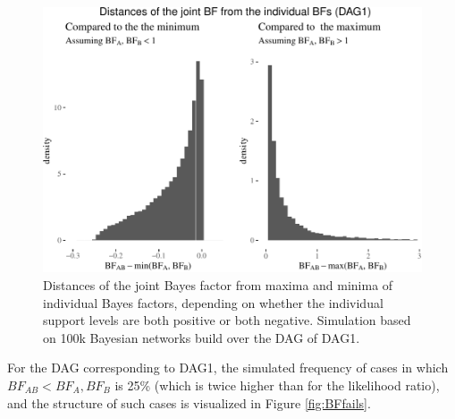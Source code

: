 \documentclass[
  10pt,
  dvipsnames,enabledeprecatedfontcommands]{scrartcl}
\begin{document}
\begin{figure}

\begin{center}\includegraphics[width=1\linewidth]{conjunction-appendix13_files/figure-latex/BFind-1} \end{center}
\caption{Distances of the joint Bayes factor from maxima and minima of individual Bayes factors, depending on whether the individual support levels are both positive or both negative. Simulation based on 100k Bayesian networks build over the DAG of \textsf{DAG1}.}
\label{fig:DAG1BF}
\end{figure}

For the DAG corresponding to \textsf{DAG1}, the simulated frequency of
cases in which \(BF_{AB} < BF_{A}, BF_{B}\) is 25\% (which is twice
higher than for the likelihood ratio), and the structure of such cases
is visualized in Figure \ref{fig:BFfails}.
\end{document}
